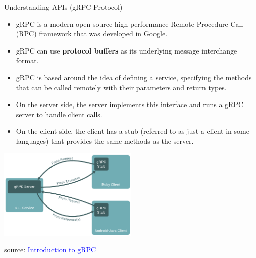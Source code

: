 \documentclass{beamer}
\begin{document}
\begin{frame}[fragile,t]{Understanding APIs \small (gRPC Protocol)}  
	
	\begin{itemize}
	\scriptsize
      \item gRPC is a modern open source high performance Remote Procedure Call (RPC) framework that was developed in Google.
      \item gRPC can use \textbf{protocol buffers} as its underlying message interchange format.
      \item gRPC is based around the idea of defining a service, specifying the methods that can be called remotely with their parameters and return types.
      \tiny
      \item On the server side, the server implements this interface and runs a gRPC server to handle client calls. 
      \item On the client side, the client has a stub (referred to as just a client in some languages) that provides the same methods as the server.
    \end{itemize}
    
    \begin{center}
      \includegraphics[width=0.5\textwidth, height=0.4\textheight]{img/grpc.png}
    \end{center}
    
    \tiny { source: \href{https://grpc.io/docs/what-is-grpc/introduction/}{\textcolor{blue}{Introduction to gRPC}}}
  
\end{frame}
\end{document}
